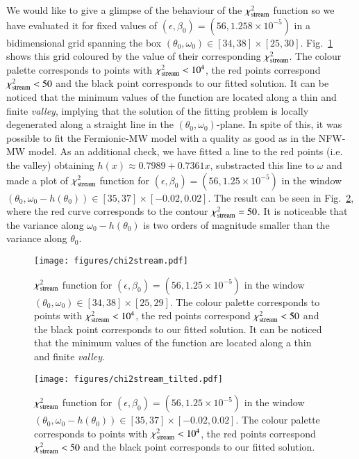 \documentclass[twocolumn]{aa}
\begin{document}
%
We would like to give a glimpse of the behaviour of the $\chi^2_{\rm{stream}}$ function so we have evaluated it for fixed values of $(\epsilon, \beta_0)=(56, 1.258\times10^{-5})$ in a bidimensional grid
spanning the box $(\theta_0, \omega_0)\in[34, 38]\times[25, 30]$.
Fig.~\ref{fig:chi2stream} shows this grid coloured by the value of their corresponding $\chi^2_{\rm{stream}}$.
The colour palette corresponds to points with $\chi^2_{\rm{stream}}<10^4$, the red points correspond $\chi^2_{\rm{stream}}<50$ and the black point corresponds to our fitted solution.
It can be noticed that the minimum values of the function are located along a thin and finite {\it valley}, implying that the solution of the fitting problem is locally degenerated along
a straight line in the $(\theta_0, \omega_0)$-plane. In spite of this, it was possible
to fit the Fermionic-MW model with a quality as good as in the NFW-MW model.
As an additional check, we have fitted a line to the red points (i.e. the valley) obtaining
$h(x)\approx 0.7989+0.7361x$, substracted this line to $\omega$ and made a plot of $\chi^2_{\rm{stream}}$ function for $(\epsilon, \beta_0)=(56, 1.25\times10^{-5})$ in the window $(\theta_0, \omega_0-h(\theta_0))\in[35, 37]\times[-0.02,0.02]$. The result can be seen in Fig.~\ref{fig:chi2stream_tilted}, where the red curve corresponds to the contour $\chi^2_{\rm{stream}}=50$. It is noticeable that the variance along $\omega_0-h(\theta_0)$ is two orders of magnitude smaller than the variance along $\theta_0$.
%
\begin{figure}
   \centering
   \texttt{[image: figures/chi2stream.pdf]}
   \caption{$\chi^2_{\rm{stream}}$ function for $(\epsilon, \beta_0)=(56, 1.25\times10^{-5})$ in
   the window $(\theta_0, \omega_0)\in[34, 38]\times[25, 29]$. The colour palette corresponds to points
   with $\chi^2_{\rm{stream}}<10^4$, the red points correspond $\chi^2_{\rm{stream}}<50$ and the black point corresponds to our fitted solution. It can be noticed that
   the minimum values of the function are located along a thin and finite {\it valley}.}
   \label{fig:chi2stream}
\end{figure}
\begin{figure}
   \centering
   \texttt{[image: figures/chi2stream\_tilted.pdf]}
   \caption{$\chi^2_{\rm{stream}}$ function for $(\epsilon, \beta_0)=(56, 1.25\times10^{-5})$ in
   the window $(\theta_0, \omega_0-h(\theta_0))\in[35, 37]\times[-0.02,0.02]$. The colour palette corresponds to points with $\chi^2_{\rm{stream}}<10^4$, the red points correspond $\chi^2_{\rm{stream}}<50$ and the black point corresponds to our fitted solution. }
   \label{fig:chi2stream_tilted}
\end{figure}
\end{document}
